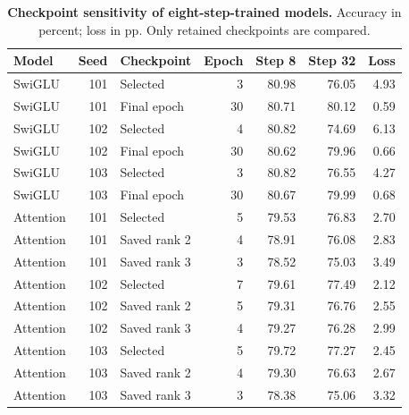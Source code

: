 \begin{table}[htbp]
\centering
\caption{\textbf{Checkpoint sensitivity of eight-step-trained models.} Accuracy in percent; loss in pp. Only retained checkpoints are compared.}
\label{tab:checkpoint_sensitivity}
\small
\begin{tabular}{lr l rrrr}
\toprule
Model & Seed & Checkpoint & Epoch & Step 8 & Step 32 & Loss \\
\midrule
SwiGLU & 101 & Selected & 3 & 80.98 & 76.05 & 4.93 \\
SwiGLU & 101 & Final epoch & 30 & 80.71 & 80.12 & 0.59 \\
SwiGLU & 102 & Selected & 4 & 80.82 & 74.69 & 6.13 \\
SwiGLU & 102 & Final epoch & 30 & 80.62 & 79.96 & 0.66 \\
SwiGLU & 103 & Selected & 3 & 80.82 & 76.55 & 4.27 \\
SwiGLU & 103 & Final epoch & 30 & 80.67 & 79.99 & 0.68 \\
Attention & 101 & Selected & 5 & 79.53 & 76.83 & 2.70 \\
Attention & 101 & Saved rank 2 & 4 & 78.91 & 76.08 & 2.83 \\
Attention & 101 & Saved rank 3 & 3 & 78.52 & 75.03 & 3.49 \\
Attention & 102 & Selected & 7 & 79.61 & 77.49 & 2.12 \\
Attention & 102 & Saved rank 2 & 5 & 79.31 & 76.76 & 2.55 \\
Attention & 102 & Saved rank 3 & 4 & 79.27 & 76.28 & 2.99 \\
Attention & 103 & Selected & 5 & 79.72 & 77.27 & 2.45 \\
Attention & 103 & Saved rank 2 & 4 & 79.30 & 76.63 & 2.67 \\
Attention & 103 & Saved rank 3 & 3 & 78.38 & 75.06 & 3.32 \\
\bottomrule
\end{tabular}
\end{table}
